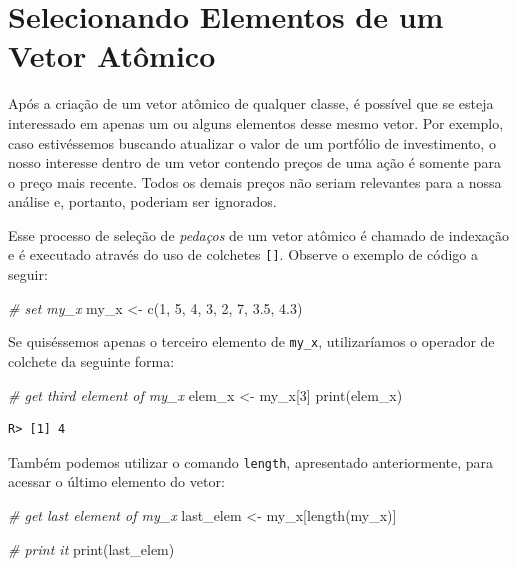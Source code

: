 \documentclass[
  11pt,
]{book}
\newenvironment{Shaded}{\begin{snugshade}}{\end{snugshade}}
\newcommand{\CommentTok}[1]{\textcolor[rgb]{0.37,0.37,0.37}{\textit{#1}}}
\newcommand{\DecValTok}[1]{\textcolor[rgb]{0.06,0.06,0.06}{#1}}
\newcommand{\FloatTok}[1]{\textcolor[rgb]{0.06,0.06,0.06}{#1}}
\newcommand{\FunctionTok}[1]{\textcolor[rgb]{0,0,0}{#1}}
\newcommand{\NormalTok}[1]{#1}
\newcommand{\OtherTok}[1]{\textcolor[rgb]{0.37,0.37,0.37}{#1}}
\begin{document}
\hypertarget{selecionando-elementos-de-um-vetor-atuxf4mico}{%
\section{Selecionando Elementos de um Vetor Atômico}\label{selecionando-elementos-de-um-vetor-atuxf4mico}}

Após a criação de um vetor atômico de qualquer classe, é possível que se esteja interessado em apenas um ou alguns elementos desse mesmo vetor. Por exemplo, caso estivéssemos buscando atualizar o valor de um portfólio de investimento, o nosso interesse dentro de um vetor contendo preços de uma ação é somente para o preço mais recente. Todos os demais preços não seriam relevantes para a nossa análise e, portanto, poderiam ser ignorados.

Esse processo de seleção de \emph{pedaços} de um vetor atômico é chamado de indexação e é executado através do uso de colchetes \texttt{{[}{]}}. Observe o exemplo de código a seguir:

\begin{Shaded}
\begin{Highlighting}[]
\CommentTok{\# set my\_x}
\NormalTok{my\_x }\OtherTok{\textless{}{-}} \FunctionTok{c}\NormalTok{(}\DecValTok{1}\NormalTok{, }\DecValTok{5}\NormalTok{, }\DecValTok{4}\NormalTok{, }\DecValTok{3}\NormalTok{, }\DecValTok{2}\NormalTok{, }\DecValTok{7}\NormalTok{, }\FloatTok{3.5}\NormalTok{, }\FloatTok{4.3}\NormalTok{)}
\end{Highlighting}
\end{Shaded}

Se quiséssemos apenas o terceiro elemento de \texttt{my\_x}, utilizaríamos o operador de colchete da seguinte forma:

\begin{Shaded}
\begin{Highlighting}[]
\CommentTok{\# get third element of my\_x}
\NormalTok{elem\_x }\OtherTok{\textless{}{-}}\NormalTok{ my\_x[}\DecValTok{3}\NormalTok{]}
\FunctionTok{print}\NormalTok{(elem\_x)}
\end{Highlighting}
\end{Shaded}

\begin{verbatim}
R> [1] 4
\end{verbatim}

Também podemos utilizar o comando \texttt{length}, apresentado anteriormente, para acessar o último elemento do vetor:

\begin{Shaded}
\begin{Highlighting}[]
\CommentTok{\# get last element of my\_x}
\NormalTok{last\_elem }\OtherTok{\textless{}{-}}\NormalTok{ my\_x[}\FunctionTok{length}\NormalTok{(my\_x)]}

\CommentTok{\# print it}
\FunctionTok{print}\NormalTok{(last\_elem)}
\end{Highlighting}
\end{Shaded}
\end{document}
